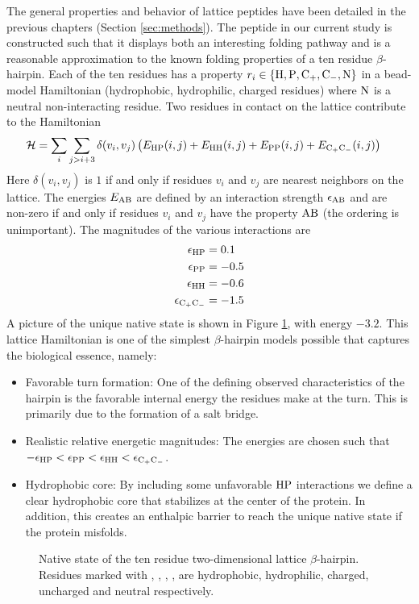 The general properties and behavior of lattice peptides have been detailed in the previous chapters (\cf Section \ref{sec:methods}). The peptide in our current study is constructed such that it displays both an interesting folding pathway and is a reasonable approximation to the known folding properties of a ten residue $\beta$-hairpin. Each of the ten residues has a property $r_i \in \left \{ \mathrm{H}, \mathrm{P}, \mathrm{C_+}, \mathrm{C_-}, \mathrm{N}  \right \}$ in a  bead-model Hamiltonian (hydrophobic, hydrophilic, charged residues) where $\mathrm{N}$ is a neutral non-interacting residue. Two residues in contact on the lattice contribute to the Hamiltonian
%
\begin{align}
  \mathcal{H} &= \sum_{i} \sum_{j>i+3} \delta(v_i,v_j) \left( 
    E_{\mathrm{HP}}(i,j) +  E_{\mathrm{H H}}(i,j) + E_{\mathrm{PP}}(i,j) +  E_{\mathrm{C_+ C_-}}(i,j) 
   \right)
\end{align}
Here $\delta(v_i, v_j)$ is $1$ if and only if residues $v_i$ and $v_j$ are nearest neighbors on the lattice. The energies $E_{\mathrm{AB}}$ are defined by an interaction strength $\epsilon_{\mathrm{AB}}$ and are non-zero if and only if residues $v_i$ and $v_j$ have the property $\mathrm{AB}$ (the ordering is unimportant). The magnitudes of the various interactions are
\begin{align}
  \epsilon_{\mathrm{H P}}      &= 0.1  \\ \notag
  \epsilon_{\mathrm{P P}}      &= -0.5 \\ \notag
  \epsilon_{\mathrm{H H}}      &= -0.6 \\ \notag
  \epsilon_{\mathrm{C_+ C_-}}  &= -1.5 
\end{align}
%
A picture of the unique native state is shown in Figure \ref{fig:betahairpin_nativestate}, with energy $-3.2$. This lattice Hamiltonian is one of the simplest $\beta$-hairpin models possible that captures the biological essence, namely:
%
\begin{itemize}
\item Favorable turn formation: One of the defining observed characteristics of the hairpin is the favorable internal energy the residues make at the turn. This is primarily due to the formation of a salt bridge. 
\item Realistic relative energetic magnitudes: The energies are chosen such that $- \epsilon_{\mathrm{HP}} < \epsilon_{\mathrm{P P}} < \epsilon_{\mathrm{H H}} < \epsilon_{\mathrm{C_+ C_-}}$.
\item Hydrophobic core: By including some unfavorable $\mathrm{HP}$ interactions we define a clear hydrophobic core that stabilizes at the center of the protein. In addition, this creates an enthalpic barrier to reach the unique native state if the protein misfolds.
\end{itemize}
%
\begin{figure}[tb]
  \TIKZbetahairpinNativestate
  \caption{Native state of the ten residue two-dimensional lattice $\beta$-hairpin. Residues marked with , , , ,  are hydrophobic, hydrophilic, charged, uncharged and neutral respectively.}
  \label{fig:betahairpin_nativestate}\end{figure}

